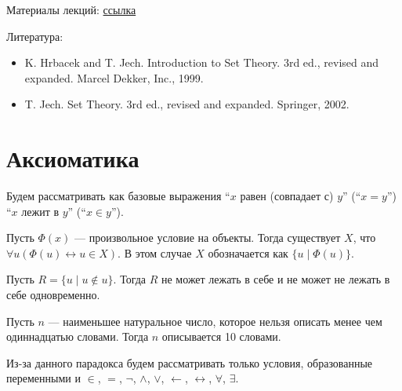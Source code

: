 \documentclass[12pt,a4paper]{article}
\date{}
\begin{document}
    \maketitle

    \listoftodos[TODOs]

    \tableofcontents

    \vspace{2em}
    Материалы лекций: \href{https://users.math-cs.spbu.ru/~speranski/courses/sets-2020-autumn/materials.html}{ссылка}
    
    Литература:
    \begin{itemize}
        \item K. Hrbacek and T. Jech. Introduction to Set Theory. 3rd ed., revised and expanded. Marcel Dekker, Inc., 1999.
        \item T. Jech. Set Theory. 3rd ed., revised and expanded. Springer, 2002.
    \end{itemize}

    \section{Аксиоматика}

    Будем рассматривать как базовые выражения ``$x$ равен (совпадает с) $y$'' (``$x=y$'') ``$x$ лежит в $y$'' (``$x\in y$'').

    \begin{definition}
        Пусть $\Phi(x)$ --- произвольное условие на объекты. Тогда существует $X$, что $\forall u (\Phi(u) \leftrightarrow u \in X)$. В этом случае $X$ обозначается как $\{u \mid \Phi(u)\}$.
    \end{definition}

    \begin{statement}
        Пусть $R = \{u \mid u \notin u\}$. Тогда $R$ не может лежать в себе и не может не лежать в себе одновременно.
    \end{statement}

    \begin{statement}
        Пусть $n$ --- наименьшее натуральное число, которое нельзя описать менее чем одиннадцатью словами. Тогда $n$ описывается 10 словами.
    \end{statement}

    Из-за данного парадокса будем рассматривать только условия, образованные переменными и $\in$, $=$, $\neg$, $\wedge$, $\vee$, $\leftarrow$, $\leftrightarrow$, $\forall$, $\exists$.
\end{document}
